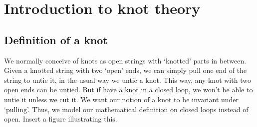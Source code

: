 \chapter{Introduction to knot theory}

\section{Definition of a knot}

We normally conceive of knots as open strings with `knotted' parts in between. Given a knotted string with two `open' ends, we can simply pull one end of the string to untie it, in the usual way we untie a knot. This way, any knot with two open ends can be untied. But if have a knot in a closed loop, we won't be able to untie it unless we cut it. We want our notion of a knot to be invariant under `pulling'. Thus, we model our mathematical definition on closed loops instead of open. Insert a figure illustrating this.

\begin{figure}
    \centering

\end{figure}



